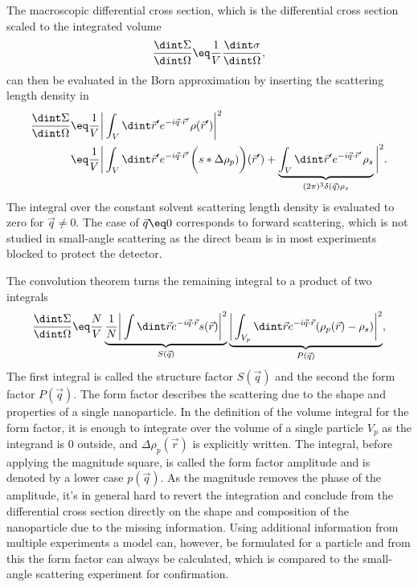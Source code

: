 \documentclass[\main/dresen_thesis.tex]{subfiles}
\begin{document}
    The macroscopic differential cross section, which is the differential cross section scaled to the integrated volume
    \begin{align}
      \frac{\dint \Sigma}{\dint \Omega} \eq \frac{1}{V} \frac{\dint \sigma}{\dint \Omega},
    \end{align}
    can then be evaluated in the Born approximation by inserting the scattering length density in 
    \begin{align}
      \frac{\dint \Sigma}{\dint \Omega}
      \eq& \frac{1}{V} \bigg| \int_V \dint \vec{r}^\prime e^{-i\vec{q} \cdot \vec{r}^\prime} \rho (\vec{r}^\prime) \bigg|^2 \\
      \eq& \frac{1}{V} \bigg| \int_{V} \dint \vec{r}^\prime e^{-i\vec{q} \cdot \vec{r}^\prime} \biggl( s * \Delta \rho_{p}) \biggr) (\vec{r}^\prime) + \underbrace{\int_{V} \dint \vec{r}^\prime e^{-i\vec{q} \cdot \vec{r}^\prime} \rho_s }_{(2 \pi)^3 \delta(\vec{q}) \rho_s} \bigg|^2.
    \end{align}
    The integral over the constant solvent scattering length density is evaluated to zero for $\vec{q} \neq 0$.
    The case of $\vec{q} \eq 0$ corresponds to forward scattering, which is not studied in small-angle scattering as the direct beam is in most experiments blocked to protect the detector.

    The convolution theorem turns the remaining integral to a product of two integrals
    \begin{align}
      \frac{\dint \Sigma}{\dint \Omega}
      \eq \frac{N}{V} \underbrace{\frac{1}{N} \bigg|\int \dint \vec{r} e^{-i\vec{q} \cdot \vec{r}} s(\vec{r})\bigg|^2}_{S(\vec{q})}
      \underbrace{ \bigg|\int_{V_{p}} \dint \vec{r} e^{-i\vec{q} \cdot \vec{r}} (\rho_p (\vec{r}) - \rho_s) \bigg|^2}_{P(\vec{q})},\label{eq:theoreticalBackground:scattering:scatteringTheory:sasParticlesformStructureFactor}
    \end{align}
    The first integral is called the structure factor $S(\vec{q})$ and the second the form factor $P(\vec{q})$.
    The form factor describes the scattering due to the shape and properties of a single nanoparticle.
    In the definition of the volume integral for the form factor, it is enough to integrate over the volume of a single particle $V_p$ as the integrand is $0$ outside, and $\Delta \rho_p (\vec{r})$ is explicitly written.
    The integral, before applying the magnitude square, is called the form factor amplitude and is denoted by a lower case $p(\vec{q})$.
    As the magnitude removes the phase of the amplitude, it's in general hard to revert the integration and conclude from the differential cross section directly on the shape and composition of the nanoparticle due to the missing information.
    Using additional information from multiple experiments a model can, however, be formulated for a particle and from this the form factor can always be calculated, which is compared to the small-angle scattering experiment for confirmation.
\end{document}
